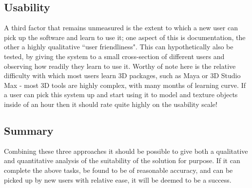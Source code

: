\documentclass[a4paper,10pt]{article}
\begin{document}
\subsection{Usability}
A third factor that remains unmeasured is the extent to which a new user can pick up the software and learn to use it; one aspect of this is documentation, the other a highly qualitative ``user friendliness". This can hypothetically also be tested, by giving the system to a small cross-section of different users and observing how readily they learn to use it. Worthy of note here is the relative difficulty with which most users learn 3D packages, such as Maya or 3D Studio Max - most 3D tools are highly complex, with many months of learning curve. If a user can pick this system up and start using it to model and texture objects inside of an hour then it should rate quite highly on the usability scale!

\subsection{Summary}
Combining these three approaches it should be possible to give both a qualitative and quantitative analysis of the suitability of the solution for purpose. If it can complete the above tasks, be found to be of reasonable accuracy, and can be picked up by new users with relative ease, it will be deemed to be a success. 

\clearpage
\renewcommand*{\refname}{\section{References}}


\end{document}
